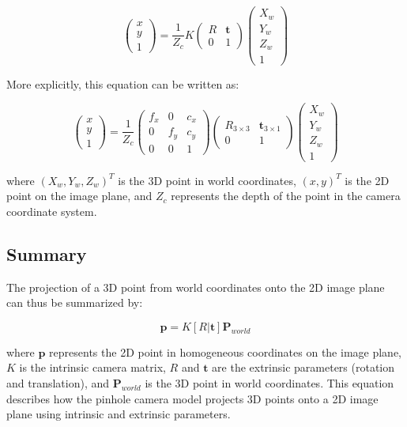 \[
\begin{pmatrix}
	x \\
	y \\
	1
\end{pmatrix}
=
\frac{1}{Z_c}
K
\begin{pmatrix}
	R & \mathbf{t} \\
	0 & 1
\end{pmatrix}
\begin{pmatrix}
	X_w \\
	Y_w \\
	Z_w \\
	1
\end{pmatrix}
\]

More explicitly, this equation can be written as:

\[
\begin{pmatrix}
	x \\
	y \\
	1
\end{pmatrix}
=
\frac{1}{Z_c}
\begin{pmatrix}
	f_x & 0 & c_x \\
	0 & f_y & c_y \\
	0 & 0 & 1
\end{pmatrix}
\begin{pmatrix}
	R_{3 \times 3} & \mathbf{t}_{3 \times 1} \\
	0 & 1
\end{pmatrix}
\begin{pmatrix}
	X_w \\
	Y_w \\
	Z_w \\
	1
\end{pmatrix}
\]

where $(X_w, Y_w, Z_w)^T$ is the 3D point in world coordinates, $(x, y)^T$ is the 2D point on the image plane, and $Z_c$ represents the depth of the point in the camera coordinate system.

\subsection{Summary}
The projection of a 3D point from world coordinates onto the 2D image plane can thus be summarized by:

\[
\mathbf{p} = K [R | \mathbf{t}] \mathbf{P}_{world}
\]

where $\mathbf{p}$ represents the 2D point in homogeneous coordinates on the image plane, $K$ is the intrinsic camera matrix, $R$ and $\mathbf{t}$ are the extrinsic parameters (rotation and translation), and $\mathbf{P}_{world}$ is the 3D point in world coordinates. This equation describes how the pinhole camera model projects 3D points onto a 2D image plane using intrinsic and extrinsic parameters.